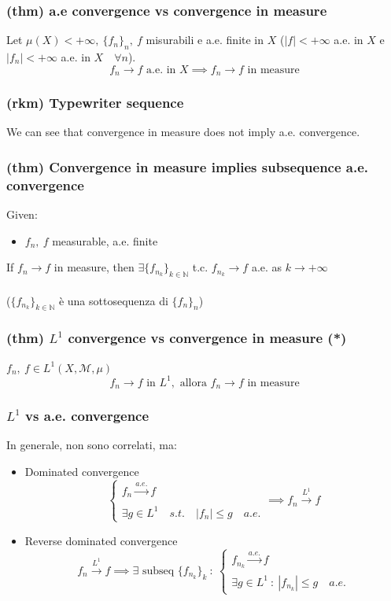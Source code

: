 \subsubsection{(thm) a.e convergence vs convergence in measure}
Let $\mu(X)<+\infty,\ \{f_n\}_n,\ f$ misurabili e a.e. finite in $X$ ($\vert f\vert<+\infty $ a.e. in $X$ e $\vert f_n\vert<+\infty $ a.e. in $X\quad \forall n$).
$$f_n\to f\text{ a.e. in }X\implies f_n\to f\text{ in measure}$$
\subsubsection{(rkm) Typewriter sequence}
We can see that convergence in measure does not imply a.e. convergence.

\subsubsection{(thm) Convergence in measure implies subsequence a.e. convergence}
Given:
\begin{itemize}
    \item $f_n,\ f$ measurable, a.e. finite
\end{itemize}
If $f_n\to f$ in measure, then $\exists \{f_{n_k}\}_{k\in \mathbb N}$ t.c. $f_{n_k}\to f$ a.e. as $k\to+\infty$\\\\
($\{f_{n_k}\}_{k\in \mathbb N}$ è una sottosequenza di $\{f_n\}_n$)

\subsubsection{(thm) $L^1$ convergence vs convergence in measure (*)}
$f_n,\ f\in L^1(X,\mathcal M,\mu)$ \\
$$f_n\to f\text{ in }L^1,\text{ allora }f_n\to f\text{ in measure}$$
\subsubsection{$L^1$ vs a.e. convergence}
In generale, non sono correlati, ma:
\begin{itemize}
    \item Dominated convergence
    $$\begin{cases}f_n\xrightarrow[]{a.e.} f\\ \exists g\in L^1\quad s.t.\quad |f_n|\leq g \quad a.e.\end{cases}\implies f_n\xrightarrow[]{L^1} f$$
    \item Reverse dominated convergence
    $$f_n\xrightarrow[]{L^1}f \implies \exists \text{ subseq }\{ f_{n_k}\}_k\ :\  \begin{cases}
        f_{n_k}\xrightarrow[]{a.e.}f\\
        \exists g\in L^1\ :\ |f_{n_k}|\leq g\quad a.e.
    \end{cases}$$
\end{itemize}
